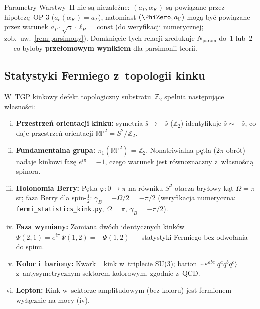 \begin{remark}\label{rem:param-correlation}
Parametry Warstwy~II nie s\k{a} niezale\.zne:
$(a_\Gamma, \alpha_K)$ s\k{a} powi\k{a}zane przez hipotez\k{e}~OP-3
($a_c(\alpha_K) = a_\Gamma$), natomiast $(\PhiZero, a_\Gamma)$
mog\k{a} by\'c powi\k{a}zane przez warunek
$a_\Gamma\cdot\sqrt\gamma\cdot\ell_P = \mathrm{const}$
(do weryfikacji numerycznej; zob.\ uw.~\ref{rem:parsimony}).
Domkni\k{e}cie tych relacji zredukuje $N_{\mathrm{param}}$
do~1 lub~2 --- co byloby \textbf{prze\l{}omowym wynikiem}
dla parsimonii teorii.
\end{remark}

\subsection{Statystyki Fermiego z~topologii kinku}\label{ssec:fermi-statistics}

\begin{proposition}%
\label{prop:fermi-statistics}
W~TGP kinkowy defekt topologiczny substratu~$\mathbb{Z}_2$ spe\l{}nia
nast\k{e}puj\k{a}ce w\l{}asno\'sci:
\begin{enumerate}[(i)]
  \item \textbf{Przestrze\'n orientacji kinku:}
    symetria $\hat{s} \to -\hat{s}$ ($\mathbb{Z}_2$) identyfikuje
    $\hat{s} \sim -\hat{s}$, co daje przestrze\'n orientacji
    $\mathbb{RP}^2 = S^2/\mathbb{Z}_2$.
  \item \textbf{Fundamentalna grupa:}
    $\pi_1(\mathbb{RP}^2) = \mathbb{Z}_2$.
    Nona\-triwialna p\k{e}tla ($2\pi$-obr\'ot) nadaje kinkowi faz\k{e}
    $e^{i\pi} = -1$, czego warunek jest r\'ownoznaczny
    z~w\l{}asno\'sci\k{a} spinora.
  \item \textbf{Holonomia Berry:}
    P\k{e}tla $\varphi: 0 \to \pi$ na r\'owniku $S^2$
    otacza bry\l{}owy k\k{a}t $\Omega = \pi$\,sr;
    faza Berry dla spin-$\tfrac{1}{2}$: $\gamma_B = -\Omega/2 = -\pi/2$
    (weryfikacja numeryczna: \texttt{fermi\_statistics\_kink.py},
    $\Omega = \pi$, $\gamma_B = -\pi/2$).
  \item \textbf{Faza wymiany:}
    Zamiana dw\'och identycznych kink\'ow
    $\Psi(2,1) = e^{i\pi}\,\Psi(1,2) = -\Psi(1,2)$
    --- statystyki Fermiego bez odwo\l{}ania do spinu.
  \item \textbf{Kolor i~bariony:}
    Kwark\,=\,kink w~triplecie SU(3); barion
    $\sim \varepsilon^{abc}|q^a q^b q^c\rangle$
    z~antysymetrycznym sektorem kolorowym, zgodnie z~QCD.
  \item \textbf{Lepton:}
    Kink w~sektorze amplitudowym (bez koloru) jest fermionem
    wy\l{}\k{a}cznie na mocy (iv).
\end{enumerate}
\end{proposition}

